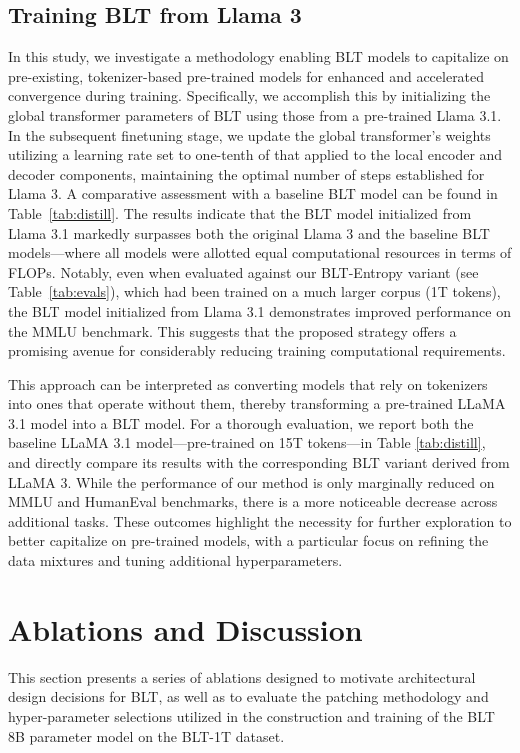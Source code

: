 \subsection{Training {\textsc BLT} from Llama 3}
\label{sec:distillation}
In this study, we investigate a methodology enabling {\textsc BLT} models to capitalize on pre-existing, tokenizer-based pre-trained models for enhanced and accelerated convergence during training. Specifically, we accomplish this by initializing the global transformer parameters of {\textsc BLT} using those from a pre-trained Llama 3.1. In the subsequent finetuning stage, we update the global transformer’s weights utilizing a learning rate set to one-tenth of that applied to the local encoder and decoder components, maintaining the optimal number of steps established for Llama 3. A comparative assessment with a baseline {\textsc BLT} model can be found in Table~\ref{tab:distill}. The results indicate that the {\textsc BLT} model initialized from Llama 3.1 markedly surpasses both the original Llama 3 and the baseline {\textsc BLT} models—where all models were allotted equal computational resources in terms of FLOPs. Notably, even when evaluated against our {\textsc BLT}-Entropy variant (see Table~\ref{tab:evals}), which had been trained on a much larger corpus (1T tokens), the {\textsc BLT} model initialized from Llama 3.1 demonstrates improved performance on the MMLU benchmark. This suggests that the proposed strategy offers a promising avenue for considerably reducing training computational requirements.

This approach can be interpreted as converting models that rely on tokenizers into ones that operate without them, thereby transforming a pre-trained LLaMA 3.1 model into a {\textsc BLT} model. For a thorough evaluation, we report both the baseline LLaMA 3.1 model—pre-trained on 15T tokens—in Table \ref{tab:distill}, and directly compare its results with the corresponding {\textsc BLT} variant derived from LLaMA 3. While the performance of our method is only marginally reduced on MMLU and HumanEval benchmarks, there is a more noticeable decrease across additional tasks. These outcomes highlight the necessity for further exploration to better capitalize on pre-trained models, with a particular focus on refining the data mixtures and tuning additional hyperparameters.

\section{Ablations and Discussion}
\label{section:ablations}
This section presents a series of ablations designed to motivate architectural design decisions for {\textsc BLT}, as well as to evaluate the patching methodology and hyper-parameter selections utilized in the construction and training of the {\textsc BLT} 8B parameter model on the {\textsc BLT}-1T dataset.

